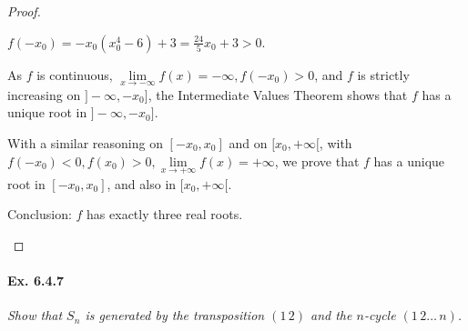 \documentclass[11pt,a4paper]{article}
\begin{document}
\begin{proof}
\begin{enumerate}
$f(-x_0) = -x_0(x_0^4-6)+3 = \frac{24}{5}x_0+3> 0$.

As $f$ is continuous, $\lim\limits_{x\to -\infty}f(x) = -\infty, f(-x_0)>0$, and $f$ is strictly increasing on $]-\infty, -x_0]$, the Intermediate Values Theorem shows that $f$ has a unique root in $]-\infty, -x_0]$.

With a similar reasoning on  $[-x_0,x_0]$ and on $[x_0,+\infty[$, with $f(-x_0)<0,f(x_0)>0,\lim\limits_{x\to +\infty}f(x) = +\infty$, we prove that $f$ has a unique root in $[-x_0,x_0]$, and also in $[x_0,+\infty[$.

Conclusion: $f$ has exactly three real roots.
\end{enumerate}
\end{proof}

\paragraph{Ex. 6.4.7}

{\it Show that $S_n$ is generated by the transposition $(1\, 2)$ and the $n$-cycle $(1\, 2 \ldots\, n)$.
}
\end{document}
